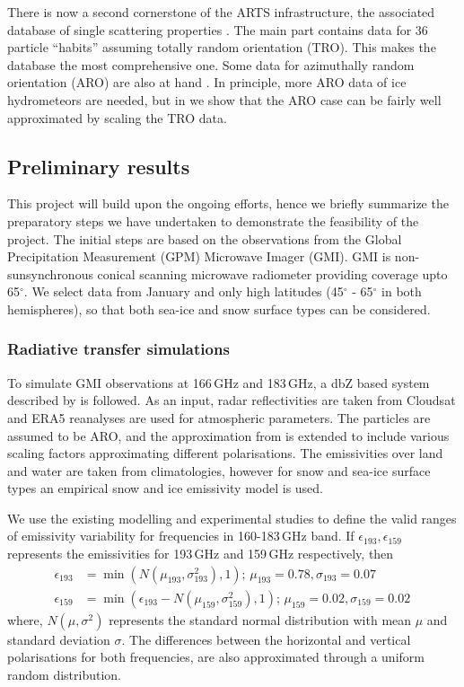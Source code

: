 \documentclass[12pt,oneside,a4paper]{article}
\begin{document}
There is now a second cornerstone of the ARTS infrastructure, the associated
database of single scattering properties \citep{eriksson:agene:18}. The main part contains data for 36 particle ``habits'' assuming totally random
orientation (TRO). This makes the database the most comprehensive one.
Some data for azimuthally random orientation (ARO) are also at hand
\citep{brath:micro:20,ekelund:micro:20}. In principle, more ARO data of ice hydrometeors are needed, but in \citet{baralakas:intro:21} we show that the ARO case can be fairly well approximated by scaling the TRO data.

\subsection{Preliminary results}
%
This project will build upon the ongoing efforts, hence we briefly summarize the preparatory steps we have undertaken to demonstrate the feasibility of the project. The initial steps are based on the  observations from the Global Precipitation Measurement (GPM) Microwave Imager (GMI). GMI is non-sunsynchronous conical scanning microwave radiometer providing coverage upto 65$^{\circ}$. We select data from January and only high latitudes (45$^{\circ}$ - 65$^{\circ}$ in both hemispheres), so that both sea-ice and snow surface types can be considered. 

\subsubsection{Radiative transfer simulations}
%
\label{sec:radiative_transfer}
To simulate GMI observations at 166\,GHz and 183\,GHz, a dbZ based system described by \citet{ekelund:using:20} is followed. As an input, radar reflectivities are taken from Cloudsat and ERA5 reanalyses are used for atmospheric parameters. The particles are assumed to be ARO, and the approximation from \citet{baralakas:intro:21} is extended to include various scaling factors approximating different polarisations. The emissivities over land and water are taken from climatologies, however for snow and sea-ice surface types an empirical snow and ice emissivity model is used. 

We use the existing modelling and experimental studies \citep{harlow:2009:milli, harlow:2012:tundr,hewison:2002:airbo} to define the valid ranges of emissivity variability for frequencies in 160-183\,GHz band. If $\epsilon_{193}, \epsilon_{159}$ represents the emissivities for 193\,GHz and 159\,GHz respectively, then
\begin{align}
\epsilon_{193}& = \min({N(\mu_{193}, \sigma_{193}^{2}), 1});\, \mu_{193} = 0.78, \sigma_{193} = 0.07 \label{eq:1}\\
\epsilon_{159}& = \min(\epsilon_{193} - N(\mu_{159}, \sigma_{159}^{2}), 1) ;\,  \mu_{159} = 0.02, \sigma_{159} = 0.02\,\label{eq:2}
\end{align}
where, $N(\mu, \sigma^{2})$ represents the standard normal distribution with mean $\mu$ and standard deviation $\sigma$. The differences between the horizontal and vertical polarisations for both frequencies, are also approximated through a uniform random distribution. 
\end{document}
